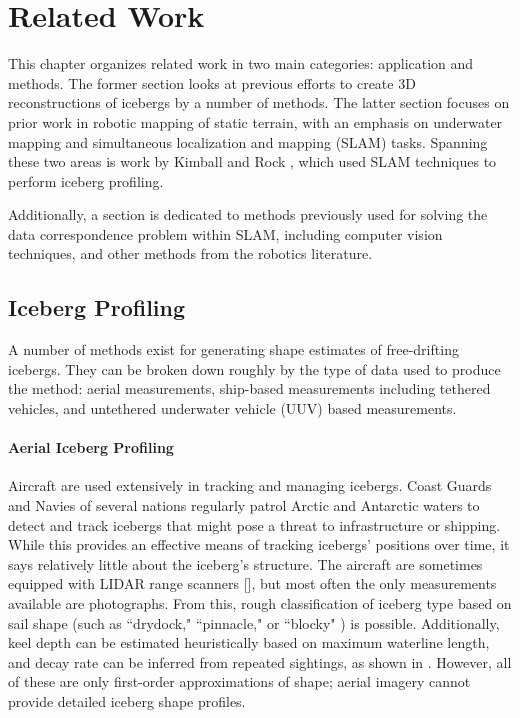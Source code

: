 
\chapter{Related Work}
\label{ch.RelatedWork}

This chapter organizes related work in two main categories: application and methods. The former section looks at previous efforts to create 3D reconstructions of icebergs by a number of methods. The latter section focuses on prior work in robotic mapping of static terrain, with an emphasis on underwater mapping and simultaneous localization and mapping (SLAM) tasks. Spanning these two areas is work by Kimball and Rock \cite{Kimball2011b}, which used SLAM techniques to perform iceberg profiling.

Additionally, a section is dedicated to methods previously used for solving the data correspondence problem within SLAM, including computer vision techniques, and other methods from the robotics literature.

\section{Iceberg Profiling}

A number of methods exist for generating shape estimates of free-drifting icebergs. They can be broken down roughly by the type of data used to produce the method: aerial measurements, ship-based measurements including tethered vehicles, and untethered underwater vehicle (UUV) based measurements.

\subsubsection{Aerial Iceberg Profiling}

Aircraft are used extensively in tracking and managing icebergs. Coast Guards and Navies of several nations regularly patrol Arctic and Antarctic waters to detect and track icebergs that might pose a threat to infrastructure or shipping. While this provides an effective means of tracking icebergs' positions over time, it says relatively little about the iceberg's structure. The aircraft are sometimes equipped with LIDAR range scanners [\cite{?}], but most often the only measurements available are photographs. From this, rough classification of iceberg type based on sail shape (such as ``drydock," ``pinnacle," or ``blocky" ) is possible. Additionally, keel depth can be estimated heuristically based on maximum waterline length, and decay rate can be inferred from repeated sightings, as shown in \cite{Barker2004}. However, all of these are only first-order approximations of shape; aerial imagery cannot provide detailed iceberg shape profiles. 

